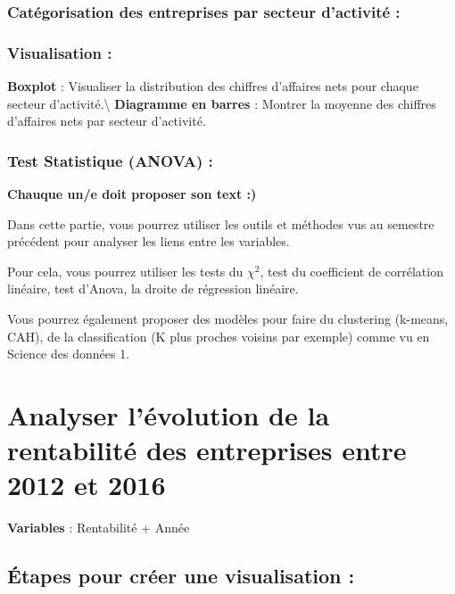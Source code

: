 \documentclass[mstat,12pt]{unswthesis}
\begin{document}
\subsubsection{Catégorisation des entreprises par secteur d'activité
:}\label{catuxe9gorisation-des-entreprises-par-secteur-dactivituxe9}

\subsubsection{Visualisation :}\label{visualisation}

\textbf{Boxplot} : Visualiser la distribution des chiffres d'affaires
nets pour chaque secteur d'activité.\textbackslash{} \textbf{Diagramme
en barres} : Montrer la moyenne des chiffres d'affaires nets par secteur
d'activité.

\subsubsection{Test Statistique (ANOVA) :}\label{test-statistique-anova}

\textbf{Chauque un/e doit proposer son text :) }

Dans cette partie, vous pourrez utiliser les outils et méthodes vus au
semestre précédent pour analyser les liens entre les variables.

Pour cela, vous pourrez utiliser les tests du \(\chi^2\), test du
coefficient de corrélation linéaire, test d'Anova, la droite de
régression linéaire.

Vous pourrez également proposer des modèles pour faire du clustering
(k-means, CAH), de la classification (K plus proches voisins par
exemple) comme vu en Science des données 1.

\newpage

\section{\texorpdfstring{\textbf{Analyser l'évolution de la rentabilité
des entreprises entre 2012 et
2016}}{Analyser l'évolution de la rentabilité des entreprises entre 2012 et 2016}}\label{analyser-luxe9volution-de-la-rentabilituxe9-des-entreprises-entre-2012-et-2016}

\bigskip

\textbf{Variables} : Rentabilité + Année

\subsection{Étapes pour créer une visualisation
:}\label{uxe9tapes-pour-cruxe9er-une-visualisation-3}
\end{document}
